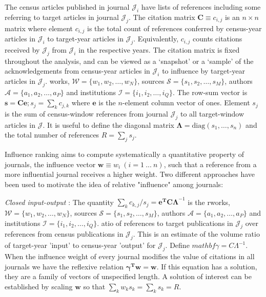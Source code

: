 \documentclass[12pt]{article}
\begin{document}
The census articles published in journal $\mathcal{J}_{i}$ have lists of references including some referring to target articles in journal $\mathcal{J}_{j}$. The citation matrix $\mathbf{C} \equiv c_{i,j}$ is an $n \times n$ matrix where element $c_{i,j}$ is the total count of references conferred by census-year articles in  $\mathcal{J}_{i}$ to target-year articles in $\mathcal{J}_{j}$. Equivalently, $c_{i,j}$ counts citations received by  $\mathcal{J}_{j}$ from $\mathcal{J}_{i}$ in the respective years. The citation matrix is fixed throughout the analysis, and can be viewed as a `snapshot' or a `sample' of the acknowledgements from census-year articles in $\mathcal{J}_{i}$ to influence by target-year articles in $\mathcal{J}_{j}$. 
works, $\mathcal{W} = \{w_1, w_2, \dots, w_N\}$, sources $\mathcal{S} = \{s_1, s_2, \dots, s_M\}$, authors $\mathcal{A} = \{a_1, a_2, \dots, a_P\}$ and institutions $\mathcal{I} = \{i_1, i_2, \dots, i_Q\}$. 
The row-sum vector is $\mathbf{s = Ce}; s_j = \sum_k c_{j,k}$ where $\mathbf e$ is the $n$-element column vector of ones. Element $s_j$ is the sum of census-window references from journal $\mathcal{J}_{j}$ to all target-window articles in $\mathcal{J}$. It is useful to define the diagonal matrix $\mathbf{\Lambda} = \mathrm{diag}(s_1,\dots,s_n)$ and the total number of references $R = \sum_j s_j$.

Influence ranking aims to compute systematically a quantitative property of journals, the influence vector $\mathbf{w} \equiv w_{i}\ (i = 1\ ...\ n)$, such that a reference from a more influential journal receives a higher weight. Two different approaches have been used to motivate the idea of relative "influence" among journals:

\textit{Closed input-output} 
\citep{pinskiCitationInfluenceJournal1976}:
The quantity $\sum_k c_{k,j}/s_j = \mathbf{e^{T}C\Lambda}^{-1}$ is the rworks, $\mathcal{W} = \{w_1, w_2, \dots, w_N\}$, sources $\mathcal{S} = \{s_1, s_2, \dots, s_M\}$, authors $\mathcal{A} = \{a_1, a_2, \dots, a_P\}$ and institutions $\mathcal{I} = \{i_1, i_2, \dots, i_Q\}$. atio of references to target publications in $\mathcal{J}_{j}$ over references from census publications in $\mathcal{J}_{j}$. This is an estimate of the volume ratio of target-year 'input' to census-year 'output' for $\mathcal{J}_{j}$. 
Define $mathbf{\gamma = C \Lambda^{-1}}$. When the influence weight of every journal modifies the value of citations in all journals we have the reflexive relation $\mathbf{\gamma^{T} w = w}$. 
If this equation has a solution, they are a family of vectors of unspecified length. A solution of interest can be established by scaling $\mathbf{w}$ so that $\sum_k w_k s_k = \sum_k s_k = R$.
\end{document}
